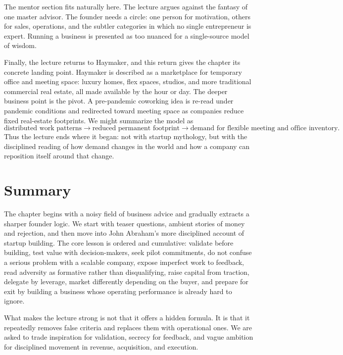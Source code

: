 The mentor section fits naturally here. The lecture argues against the fantasy of one master advisor. The founder needs a circle: one person for motivation, others for sales, operations, and the subtler categories in which no single entrepreneur is expert. Running a business is presented as too nuanced for a single-source model of wisdom.

Finally, the lecture returns to Haymaker, and this return gives the chapter its concrete landing point. Haymaker is described as a marketplace for temporary office and meeting space: luxury homes, flex spaces, studios, and more traditional commercial real estate, all made available by the hour or day. The deeper business point is the pivot. A pre-pandemic coworking idea is re-read under pandemic conditions and redirected toward meeting space as companies reduce fixed real-estate footprints. We might summarize the model as
\begin{equation}
\text{distributed work patterns}
\longrightarrow
\text{reduced permanent footprint}
\longrightarrow
\text{demand for flexible meeting and office inventory}.
\end{equation}
Thus the lecture ends where it began: not with startup mythology, but with the disciplined reading of how demand changes in the world and how a company can reposition itself around that change.

\section{Summary}

The chapter begins with a noisy field of business advice and gradually extracts a sharper founder logic. We start with teaser questions, ambient stories of money and rejection, and then move into John Abraham's more disciplined account of startup building. The core lesson is ordered and cumulative: validate before building, test value with decision-makers, seek pilot commitments, do not confuse a serious problem with a scalable company, expose imperfect work to feedback, read adversity as formative rather than disqualifying, raise capital from traction, delegate by leverage, market differently depending on the buyer, and prepare for exit by building a business whose operating performance is already hard to ignore.

What makes the lecture strong is not that it offers a hidden formula. It is that it repeatedly removes false criteria and replaces them with operational ones. We are asked to trade inspiration for validation, secrecy for feedback, and vague ambition for disciplined movement in revenue, acquisition, and execution.